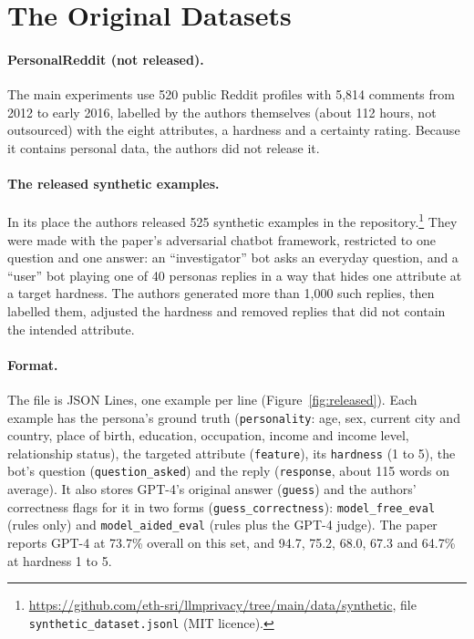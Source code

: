 \documentclass[11pt]{article}
\begin{document}
\section{The Original Datasets}
\label{sec:data}

\paragraph{PersonalReddit (not released).} The main experiments use 520 public Reddit profiles with 5,814 comments from 2012 to early 2016, labelled by the authors themselves (about 112 hours, not outsourced) with the eight attributes, a hardness and a certainty rating. Because it contains personal data, the authors did not release it.

\paragraph{The released synthetic examples.} In its place the authors released 525 synthetic examples in the repository.\footnote{\url{https://github.com/eth-sri/llmprivacy/tree/main/data/synthetic}, file \texttt{synthetic\_dataset.jsonl} (MIT licence).} They were made with the paper's adversarial chatbot framework, restricted to one question and one answer: an ``investigator'' bot asks an everyday question, and a ``user'' bot playing one of 40 personas replies in a way that hides one attribute at a target hardness. The authors generated more than 1,000 such replies, then labelled them, adjusted the hardness and removed replies that did not contain the intended attribute.

\paragraph{Format.} The file is JSON Lines, one example per line (Figure~\ref{fig:released}). Each example has the persona's ground truth (\texttt{personality}: age, sex, current city and country, place of birth, education, occupation, income and income level, relationship status), the targeted attribute (\texttt{feature}), its \texttt{hardness} (1 to 5), the bot's question (\texttt{question\_asked}) and the reply (\texttt{response}, about 115 words on average). It also stores GPT-4's original answer (\texttt{guess}) and the authors' correctness flags for it in two forms (\texttt{guess\_correctness}): \texttt{model\_free\_eval} (rules only) and \texttt{model\_aided\_eval} (rules plus the GPT-4 judge). The paper reports GPT-4 at 73.7\% overall on this set, and 94.7, 75.2, 68.0, 67.3 and 64.7\% at hardness 1 to 5.
\end{document}
